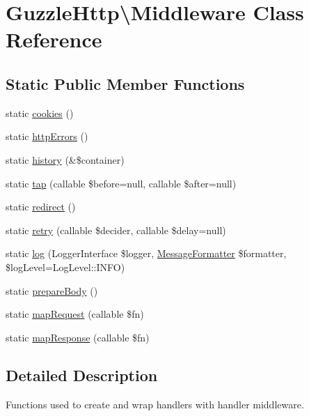 \hypertarget{classGuzzleHttp_1_1Middleware}{}\section{Guzzle\+Http\textbackslash{}Middleware Class Reference}
\label{classGuzzleHttp_1_1Middleware}
\subsection*{Static Public Member Functions}
\begin{DoxyCompactItemize}
\item 
static \hyperlink{classGuzzleHttp_1_1Middleware_abb0cd141fa9bbd10ee7beda7c521a215}{cookies} ()
\item 
static \hyperlink{classGuzzleHttp_1_1Middleware_a5c98a3a7d767bc21143079f727c42a84}{http\+Errors} ()
\item 
static \hyperlink{classGuzzleHttp_1_1Middleware_a44a16ad53ee3186a658d4cc68289f890}{history} (\&\$container)
\item 
static \hyperlink{classGuzzleHttp_1_1Middleware_a9934cf62356f0adf6337e743b82102d7}{tap} (callable \$before=null, callable \$after=null)
\item 
static \hyperlink{classGuzzleHttp_1_1Middleware_a6d1b4274e26f8f1f3c51b1e4844ec9ec}{redirect} ()
\item 
static \hyperlink{classGuzzleHttp_1_1Middleware_ae8f773aa3f128c466a0a081988af23db}{retry} (callable \$decider, callable \$delay=null)
\item 
static \hyperlink{classGuzzleHttp_1_1Middleware_a90393ebcd93ae23f2a41747ff1cb4fd5}{log} (Logger\+Interface \$logger, \hyperlink{classGuzzleHttp_1_1MessageFormatter}{Message\+Formatter} \$formatter, \$log\+Level=Log\+Level\+::\+I\+N\+FO)
\item 
static \hyperlink{classGuzzleHttp_1_1Middleware_aa12c25e34cb9d0f743b1d8b4cf4a8087}{prepare\+Body} ()
\item 
static \hyperlink{classGuzzleHttp_1_1Middleware_af61853d8071e1ce0cdb7949baaec17e3}{map\+Request} (callable \$fn)
\item 
static \hyperlink{classGuzzleHttp_1_1Middleware_a387ee9898c216d62085aa32b3a7bb8e4}{map\+Response} (callable \$fn)
\end{DoxyCompactItemize}


\subsection{Detailed Description}
Functions used to create and wrap handlers with handler middleware. 


